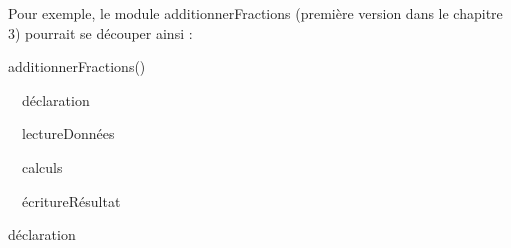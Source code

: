 {
Pour exemple, le module additionnerFractions (première version dans le
chapitre 3) pourrait se découper ainsi :}

{\sffamily
{}
additionnerFractions()}

{\sffamily
\ \ déclaration}

{\sffamily
\ \ lectureDonnées}

{\sffamily
\ \ calculs}

{\sffamily
\ \ écritureRésultat}

{\sffamily
{}}

\bigskip

{\sffamily
{} déclaration}

